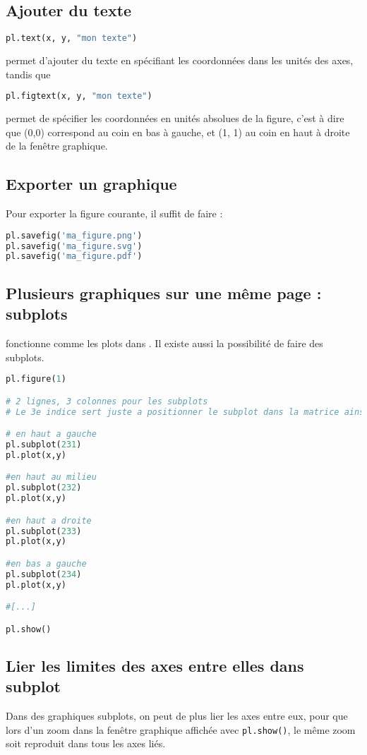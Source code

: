 \documentclass[a4paper,twoside]{article}
\begin{document}
\subsection{Ajouter du texte}
\begin{lstlisting}[language=python]
pl.text(x, y, "mon texte")
\end{lstlisting}
permet d'ajouter du texte en spécifiant les coordonnées dans les unités des axes, tandis que
\begin{lstlisting}[language=python]
pl.figtext(x, y, "mon texte")
\end{lstlisting}
permet de spécifier les coordonnées en unités absolues de la figure, c'est à dire que (0,0) correspond au coin en bas à gauche, et (1, 1) au coin en haut à droite de la fenêtre graphique.

\subsection{Exporter un graphique}
Pour exporter la figure courante, il suffit de faire :
\begin{lstlisting}[language=python]
pl.savefig('ma_figure.png')
pl.savefig('ma_figure.svg')
pl.savefig('ma_figure.pdf')
\end{lstlisting}

\subsection{Plusieurs graphiques sur une même page : subplots}
 fonctionne comme les plots dans . Il existe aussi la possibilité de faire des subplots.

\begin{lstlisting}[language=python]
pl.figure(1)

# 2 lignes, 3 colonnes pour les subplots
# Le 3e indice sert juste a positionner le subplot dans la matrice ainsi creee

# en haut a gauche
pl.subplot(231)
pl.plot(x,y)

#en haut au milieu
pl.subplot(232)
pl.plot(x,y)

#en haut a droite
pl.subplot(233)
pl.plot(x,y)

#en bas a gauche
pl.subplot(234)
pl.plot(x,y)

#[...]

pl.show()
\end{lstlisting}

\subsection{Lier les limites des axes entre elles dans subplot}
Dans des graphiques subplots, on peut de plus lier les axes entre eux, pour que lors d'un zoom dans la fenêtre graphique affichée avec \texttt{pl.show()}, le même zoom soit reproduit dans tous les axes liés.
\end{document}
